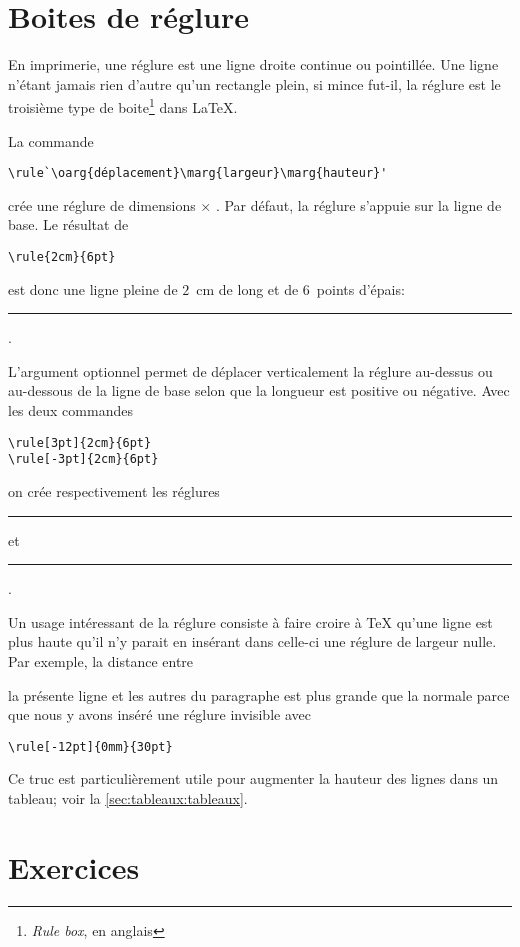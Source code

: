 \section{Boites de réglure}
\label{sec:boites:rulebox}

En imprimerie, une réglure est une ligne droite continue ou
pointillée. Une ligne n'étant jamais rien d'autre qu'un rectangle
plein, si mince fut-il, la réglure est le troisième type de
boite\footnote{%
  \emph{Rule box}, en anglais} %
dans {\LaTeX}.

La commande
\begin{lstlisting}
\rule`\oarg{déplacement}\marg{largeur}\marg{hauteur}'
\end{lstlisting}
crée une réglure de dimensions  $\times$ .
Par défaut, la réglure s'appuie sur la ligne de base. Le résultat de
\begin{lstlisting}
\rule{2cm}{6pt}
\end{lstlisting}
est donc une ligne pleine de $2$~cm de long et de $6$~points d'épais:
\rule{2cm}{6pt}.

L'argument optionnel  permet de déplacer
verticalement la réglure au-dessus ou au-dessous de la ligne de base
selon que la longueur  est positive ou négative. Avec les deux
commandes
\begin{lstlisting}
\rule[3pt]{2cm}{6pt}
\rule[-3pt]{2cm}{6pt}
\end{lstlisting}
on crée respectivement les réglures \rule[3pt]{2cm}{6pt} et
\rule[-3pt]{2cm}{6pt}.

Un usage intéressant de la réglure consiste à faire croire à {\TeX}
qu'une ligne est plus haute qu'il n'y parait en insérant dans celle-ci
une réglure de largeur nulle. Par exemple, la distance entre
\rule[-12pt]{0mm}{30pt}\relax la présente ligne et les autres du paragraphe est
plus grande que la normale parce que nous y avons inséré une réglure
invisible avec
\begin{lstlisting}
\rule[-12pt]{0mm}{30pt}
\end{lstlisting}
Ce truc est particulièrement utile pour augmenter la hauteur des
lignes dans un tableau; voir la \autoref{sec:tableaux:tableaux}.




\section{Exercices}
\label{sec:boites:exercices}

